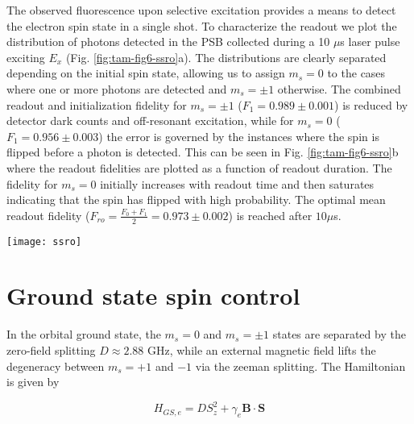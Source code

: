 The observed fluorescence upon selective excitation provides a means to detect the electron spin state in a single shot\cite{Robledo_Nature_2011}. To characterize the readout we plot the distribution of photons detected in the PSB collected during a 10 $\mu$s laser pulse exciting $E_x$ (Fig. \ref{fig:tam-fig6-ssro}a). The distributions are clearly separated depending on the initial spin state, allowing us to assign $m_s = 0$ to the cases where one or more photons are detected and $m_s = \pm 1$ otherwise. The combined readout and initialization fidelity for $m_s = \pm 1$ ($F_1 = 0.989 \pm 0.001$) is reduced by detector dark counts and off-resonant excitation, while for $m_s = 0$ ($F_1 = 0.956 \pm 0.003$) the error is governed by the instances where the spin is flipped before a photon is detected. This can be seen in Fig. \ref{fig:tam-fig6-ssro}b where the readout fidelities are plotted as a function of readout duration. The fidelity for $m_s = 0$ initially increases with readout time and then saturates indicating that the spin has flipped with high probability. The optimal mean readout fidelity ($F_{ro} = \frac{F_0+F_1}{2} = 0.973 \pm 0.002$) is reached after $10 \mu$s.

\begin{figure*}
	\centering
	\texttt{[image: ssro]}
	\caption{\label{fig:tam-fig6-ssro} \textbf{Single shot readout.} (a) Histograms of the number of detected photons in the PSB for initial state $m_s = 0$ (blue) and $m_s=\pm 1$ (red) during a 10 $\mu$s readout on $E_x$. (b) Fidelities for reading out the electron spin state initially prepared in $m_s = 0$ (blue) and $m_s = \pm 1$ (red) as a function of readout duration. The mean readout fidelity is plotted in grey. The inset is a zoom of the region where the optimal mean readout fidelity is reached.}
\end{figure*}

\section{Ground state spin control}

In the orbital ground state, the $m_s = 0$ and $m_s = \pm 1$ states are separated by the zero-field splitting $D \approx 2.88$ GHz, while an external magnetic field lifts the degeneracy between $m_s = +1$ and $-1$ via the zeeman splitting. The Hamiltonian is given by

\begin{equation}
H_{GS,e} = D S_z^2 + \gamma_e \mathbf{B} \cdot \mathbf{S}
\end{equation}

